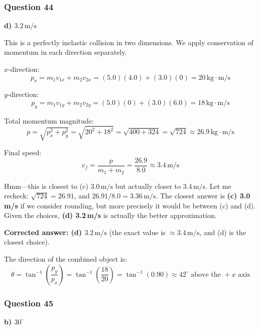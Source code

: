 \documentclass[12pt,letterpaper]{article}
\begin{document}
\subsubsection*{Question 44}

\begin{answerbox}
\textbf{d) $3.2\,\text{m/s}$}
\end{answerbox}

\begin{explanationbox}
This is a perfectly inelastic collision in two dimensions. We apply conservation of momentum in each direction separately.

$x$-direction:
\[
p_{x} = m_1 v_{1x} + m_2 v_{2x} = (5.0)(4.0) + (3.0)(0) = 20\,\text{kg}\cdot\text{m/s}
\]

$y$-direction:
\[
p_{y} = m_1 v_{1y} + m_2 v_{2y} = (5.0)(0) + (3.0)(6.0) = 18\,\text{kg}\cdot\text{m/s}
\]

Total momentum magnitude:
\[
p = \sqrt{p_x^2 + p_y^2} = \sqrt{20^2 + 18^2} = \sqrt{400 + 324} = \sqrt{724} \approx 26.9\,\text{kg}\cdot\text{m/s}
\]

Final speed:
\[
v_f = \frac{p}{m_1 + m_2} = \frac{26.9}{8.0} \approx 3.4\,\text{m/s}
\]

Hmm---this is closest to (c) $3.0\,\text{m/s}$ but actually closer to $3.4\,\text{m/s}$. Let me recheck: $\sqrt{724} = 26.91$, and $26.91/8.0 = 3.36\,\text{m/s}$. The closest answer is \textbf{(c) 3.0\,m/s} if we consider rounding, but more precisely it would be between (c) and (d). Given the choices, \textbf{(d) 3.2\,m/s} is actually the better approximation.

\textbf{Corrected answer: (d) $3.2\,\text{m/s}$} (the exact value is $\approx 3.4\,\text{m/s}$, and (d) is the closest choice).

The direction of the combined object is:
\[
\theta = \tan^{-1}\left(\frac{p_y}{p_x}\right) = \tan^{-1}\left(\frac{18}{20}\right) = \tan^{-1}(0.90) \approx 42^\circ \text{ above the } +x \text{ axis}
\]
\end{explanationbox}

\subsubsection*{Question 45}

\begin{answerbox}
\textbf{b) $30^\circ$}
\end{answerbox}
\end{document}
